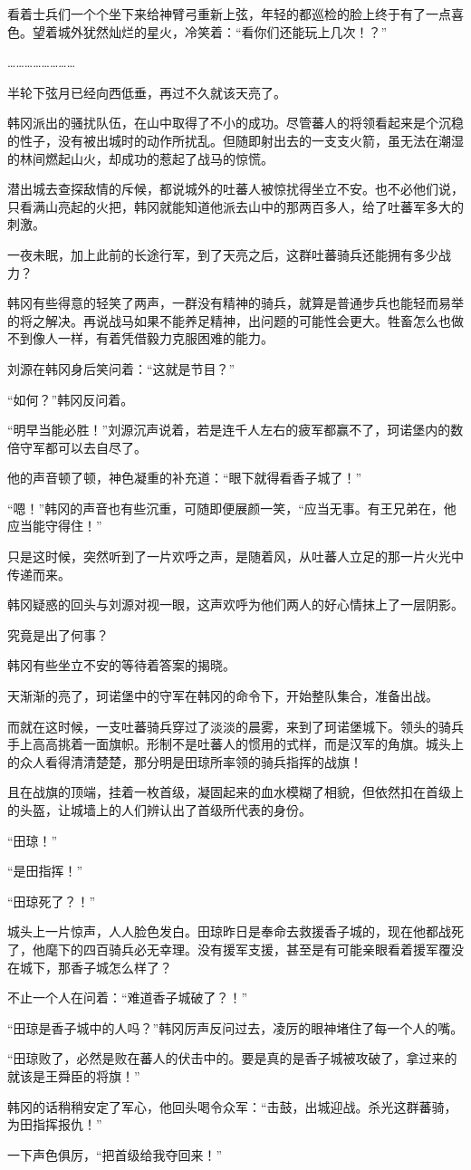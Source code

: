 看着士兵们一个个坐下来给神臂弓重新上弦，年轻的都巡检的脸上终于有了一点喜色。望着城外犹然灿烂的星火，冷笑着：“看你们还能玩上几次！？”

……………………

半轮下弦月已经向西低垂，再过不久就该天亮了。

韩冈派出的骚扰队伍，在山中取得了不小的成功。尽管蕃人的将领看起来是个沉稳的性子，没有被出城时的动作所扰乱。但随即射出去的一支支火箭，虽无法在潮湿的林间燃起山火，却成功的惹起了战马的惊慌。

潜出城去查探敌情的斥候，都说城外的吐蕃人被惊扰得坐立不安。也不必他们说，只看满山亮起的火把，韩冈就能知道他派去山中的那两百多人，给了吐蕃军多大的刺激。

一夜未眠，加上此前的长途行军，到了天亮之后，这群吐蕃骑兵还能拥有多少战力？

韩冈有些得意的轻笑了两声，一群没有精神的骑兵，就算是普通步兵也能轻而易举的将之解决。再说战马如果不能养足精神，出问题的可能性会更大。牲畜怎么也做不到像人一样，有着凭借毅力克服困难的能力。

刘源在韩冈身后笑问着：“这就是节目？”

“如何？”韩冈反问着。

“明早当能必胜！”刘源沉声说着，若是连千人左右的疲军都赢不了，珂诺堡内的数倍守军都可以去自尽了。

他的声音顿了顿，神色凝重的补充道：“眼下就得看香子城了！”

“嗯！”韩冈的声音也有些沉重，可随即便展颜一笑，“应当无事。有王兄弟在，他应当能守得住！”

只是这时候，突然听到了一片欢呼之声，是随着风，从吐蕃人立足的那一片火光中传递而来。

韩冈疑惑的回头与刘源对视一眼，这声欢呼为他们两人的好心情抹上了一层阴影。

究竟是出了何事？

韩冈有些坐立不安的等待着答案的揭晓。

天渐渐的亮了，珂诺堡中的守军在韩冈的命令下，开始整队集合，准备出战。

而就在这时候，一支吐蕃骑兵穿过了淡淡的晨雾，来到了珂诺堡城下。领头的骑兵手上高高挑着一面旗帜。形制不是吐蕃人的惯用的式样，而是汉军的角旗。城头上的众人看得清清楚楚，那分明是田琼所率领的骑兵指挥的战旗！

且在战旗的顶端，挂着一枚首级，凝固起来的血水模糊了相貌，但依然扣在首级上的头盔，让城墙上的人们辨认出了首级所代表的身份。

“田琼！”

“是田指挥！”

“田琼死了？！”

城头上一片惊声，人人脸色发白。田琼昨日是奉命去救援香子城的，现在他都战死了，他麾下的四百骑兵必无幸理。没有援军支援，甚至是有可能亲眼看着援军覆没在城下，那香子城怎么样了？

不止一个人在问着：“难道香子城破了？！”

“田琼是香子城中的人吗？”韩冈厉声反问过去，凌厉的眼神堵住了每一个人的嘴。

“田琼败了，必然是败在蕃人的伏击中的。要是真的是香子城被攻破了，拿过来的就该是王舜臣的将旗！”

韩冈的话稍稍安定了军心，他回头喝令众军：“击鼓，出城迎战。杀光这群蕃骑，为田指挥报仇！”

一下声色俱厉，“把首级给我夺回来！”


